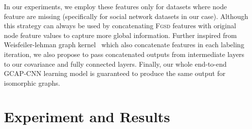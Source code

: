 \documentclass{article}
\begin{document}
In our experiments, we employ   these features only for datasets  where node feature are missing (specifically for social network datasets in our case). Although this strategy can   always be used by concatenating  \textsc{Fgsd} features with original node feature values to capture more global information. Further  inspired from Weisfeiler-lehman graph kernel~\cite{shervashidze2011weisfeiler} which also concatenate features in each labeling iteration, we also propose to pass concatenated   outputs from intermediate layers to our covariance   and  fully connected layers. Finally, our whole end-to-end GCAP-CNN learning model     is guaranteed   to produce the same output  for isomorphic graphs. 
       




 
\section{Experiment and Results}\label{sec:exp_results}
\end{document}
